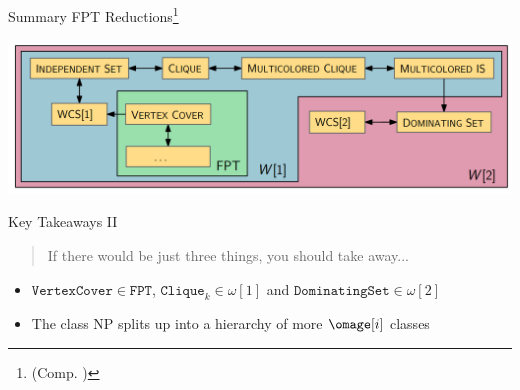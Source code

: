 \begin{frame}[c]{Summary FPT Reductions\footnote{(Comp. \cite{fptland})}}
    \begin{center}
        \includegraphics[scale=0.3]{img/landscape.png}
    \end{center}
\end{frame}

\begin{frame}[c]{Key Takeaways II}
\begin{center}
\begin{quote}
    If there would be just three things, you should take away...
\end{quote}
\begin{itemize}
    \item $\mathtt{Vertex Cover} \in \mathtt{FPT}$,  $\mathtt{Clique}_k \in \omega[1]$ and  $\mathtt{Dominating Set} \in \omega[2]$
    \item The class NP splits up into a hierarchy of more  $\omage[i]$ classes
\end{itemize}
\end{center}
\end{frame}
